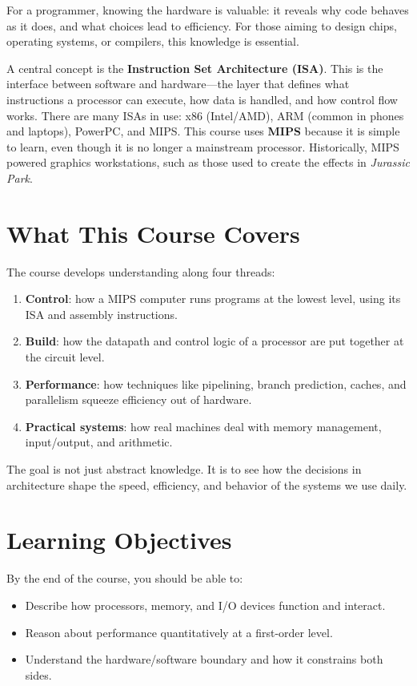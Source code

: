 \documentclass[11pt]{article}
\begin{document}
For a programmer, knowing the hardware is valuable: it reveals why code behaves as it does, and what choices lead to efficiency. For those aiming to design chips, operating systems, or compilers, this knowledge is essential.  

A central concept is the \textbf{Instruction Set Architecture (ISA)}. This is the interface between software and hardware—the layer that defines what instructions a processor can execute, how data is handled, and how control flow works. There are many ISAs in use: x86 (Intel/AMD), ARM (common in phones and laptops), PowerPC, and MIPS. This course uses \textbf{MIPS} because it is simple to learn, even though it is no longer a mainstream processor. Historically, MIPS powered graphics workstations, such as those used to create the effects in \emph{Jurassic Park}.

\section*{What This Course Covers}
The course develops understanding along four threads:
\begin{enumerate}
  \item \textbf{Control}: how a MIPS computer runs programs at the lowest level, using its ISA and assembly instructions.
  \item \textbf{Build}: how the datapath and control logic of a processor are put together at the circuit level.
  \item \textbf{Performance}: how techniques like pipelining, branch prediction, caches, and parallelism squeeze efficiency out of hardware.
  \item \textbf{Practical systems}: how real machines deal with memory management, input/output, and arithmetic.
\end{enumerate}

The goal is not just abstract knowledge. It is to see how the decisions in architecture shape the speed, efficiency, and behavior of the systems we use daily.

\section*{Learning Objectives}
By the end of the course, you should be able to:
\begin{itemize}
  \item Describe how processors, memory, and I/O devices function and interact.
  \item Reason about performance quantitatively at a first-order level.
  \item Understand the hardware/software boundary and how it constrains both sides.
\end{itemize}
\end{document}
